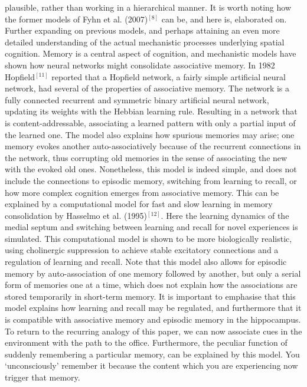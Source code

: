 plausible, rather than working in a hierarchical manner. It is worth noting how the former models of Fyhn et al. (2007)$^{[8]}$ can be, and here is, elaborated on. Further expanding on previous models, and perhaps attaining an even more detailed understanding of the actual mechanistic processes underlying spatial cognition. 
Memory is a central aspect of cognition, and mechanistic models have shown how neural networks might consolidate associative memory. In 1982 Hopfield$^{[11]}$ reported that a Hopfield network, a fairly simple artificial neural network, had several of the properties of associative memory. The network is a fully connected recurrent and symmetric binary artificial neural network, updating its weights with the Hebbian learning rule. Resulting in a network that is content-addressable, associating a learned pattern with only a partial input of the learned one. The model also explains how spurious memories may arise; one memory evokes another auto-associatively because of the recurrent connections in the network, thus corrupting old memories in the sense of associating the new with the evoked old ones. Nonetheless, this model is indeed simple, and does not include the connections to episodic memory, switching from learning to recall, or how more complex cognition emerges from associative memory. This can be explained by a computational model for fast and slow learning in memory consolidation by Hasselmo et al. (1995)$^{[12]}$. Here the learning dynamics of the medial septum and switching between learning and recall for novel experiences is simulated. This computational model is shown to be more biologically realistic, using cholinergic suppression to achieve stable excitatory connections and a regulation of learning and recall. Note that this model also allows for episodic memory by auto-association of one memory followed by another, but only a serial form of memories one at a time, which does not explain how the associations are stored temporarily in short-term memory. It is important to emphasise that this model explains how learning and recall may be regulated, and furthermore that it is compatible with associative memory and episodic memory in the hippocampus. To return to the recurring analogy of this paper, we can now associate cues in the environment with the path to the office. Furthermore, the peculiar function of suddenly remembering a particular memory, can be explained by this model. You ‘unconsciously’ remember it because the content which you are experiencing now trigger that memory.

